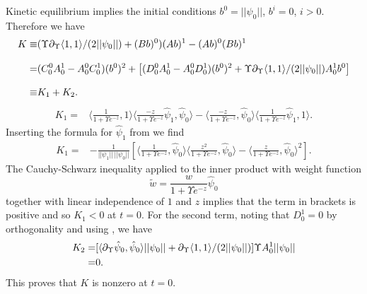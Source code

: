  Kinetic equilibrium implies the initial conditions $b^0=||\psi_0||$, $b^i=0$, $i>0$.  Therefore we have
\begin{align}
K\equiv& (\Upsilon\partial_\Upsilon \langle 1,1\rangle/(2||\psi_0||)+(Bb)^0)(Ab)^1-(Ab)^0(Bb)^1\\[0.3cm]
=&(C^0_0A^1_0-A^0_0C^1_0)(b^0)^2+\left[(D^0_0A^1_0-A^0_0D^1_0)(b^0)^2+\Upsilon\partial_\Upsilon \langle 1,1\rangle/(2||\psi_0||)A^1_0b^0\right]\notag\\[0.3cm]
\equiv & K_1+K_2.\notag
\end{align}
\begin{align}
K_1=&\langle \frac{1}{1+\Upsilon e^{-z}},1\rangle\langle \frac{-z}{1+\Upsilon e^{-z}}\hat\psi_1,\hat\psi_0\rangle-\langle\frac{-z}{1+\Upsilon e^{-z}},\hat\psi_0\rangle\langle\frac{1}{1+ \Upsilon e^{-z}}\hat\psi_1,1\rangle.
\end{align}
Inserting the formula for $\hat\psi_1$ from  we find
\begin{align}
K_1=&-\frac{1}{||\psi_1||\,||\psi_0||}\left[\langle\frac{1}{1+ \Upsilon e^{-z}},\hat\psi_0\rangle\langle\frac{z^2}{1+\Upsilon e^{-z}},\hat\psi_0\rangle-\langle\frac{z}{1+\Upsilon e^{-z}},\hat\psi_0\rangle^2\right].
\end{align}
The Cauchy-Schwarz inequality  applied to the inner product with weight function
\begin{equation}
\tilde{w}=\frac{w}{1+\Upsilon e^{-z}}\hat\psi_0
\end{equation}
together with linear independence of $1$ and $z$ implies that the term in brackets is positive and so $K_1<0$ at $t=0$.  For the second term, noting that $D^1_0=0$ by orthogonality and using , we have
\begin{align}
K_2=&[\langle\partial_\Upsilon\hat\psi_0,\hat\psi_0\rangle||\psi_0||+\partial_\Upsilon \langle 1,1\rangle/(2||\psi_0||)]\Upsilon A_0^1||\psi_0||\\
=&0.\notag
\end{align}
This proves that $K$ is nonzero at $t=0$.\\

